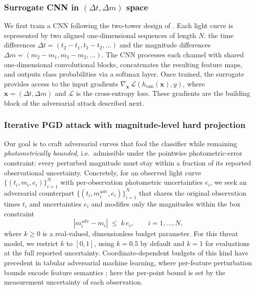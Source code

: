 \documentclass{aa}
\begin{document}
\subsubsection{Surrogate CNN in $(\Delta t, \Delta m)$ space} \label{cnn_classifier}
We first train a CNN following the two-tower design of \citet{aguirre2019deep}. Each light curve is represented by two aligned one-dimensional sequences of length $N$: the time differences $\Delta t = (t_2 - t_1, t_3 - t_2, \ldots)$ and the magnitude differences $\Delta m = (m_2 - m_1, m_3 - m_2, \ldots)$. The CNN processes each channel with shared one-dimensional convolutional blocks, concatenates the resulting feature maps, and outputs class probabilities via a softmax layer. Once trained, the surrogate provides access to the input gradients $\nabla_{\mathbf{x}}\, \mathcal{L}(h_{\mathrm{cnn}}(\mathbf{x}), y)$, where $\mathbf{x}=(\Delta t, \Delta m)$ and $\mathcal{L}$ is the cross-entropy loss. These gradients are the building block of the adversarial attack described next.

\subsubsection{Iterative PGD attack with magnitude-level hard projection} \label{adv_generation}
Our goal is to craft adversarial curves that fool the classifier while remaining \emph{photometrically bounded}, i.e.\ admissible under the pointwise photometric-error constraint: every perturbed magnitude must stay within a fraction of its reported observational uncertainty. Concretely, for an observed light curve $\{(t_i, m_i, e_i)\}_{i=1}^{N}$ with per-observation photometric uncertainties $e_i$, we seek an adversarial counterpart $\{(t_i, m^{\mathrm{adv}}_i, e_i)\}_{i=1}^{N}$ that shares the original observation times $t_i$ and uncertainties $e_i$ and modifies only the magnitudes within the box constraint
\begin{equation}
\label{eq:photobound}
|m^{\mathrm{adv}}_i - m_i| \;\le\; k\,e_i, \qquad i = 1, \ldots, N,
\end{equation}
where $k \geq 0$ is a real-valued, dimensionless budget parameter.
For this threat model, we restrict $k$ to $[0,1]$, using $k=0.5$
by default and $k=1$ for evaluations at the full reported uncertainty. Coordinate-dependent budgets of this kind have precedent in tabular adversarial machine learning, where per-feature perturbation bounds encode feature semantics \citep{ballet2019imperceptible, erdemir2021nonuniform}; here the per-point bound is set by the measurement uncertainty of each observation.
\end{document}

